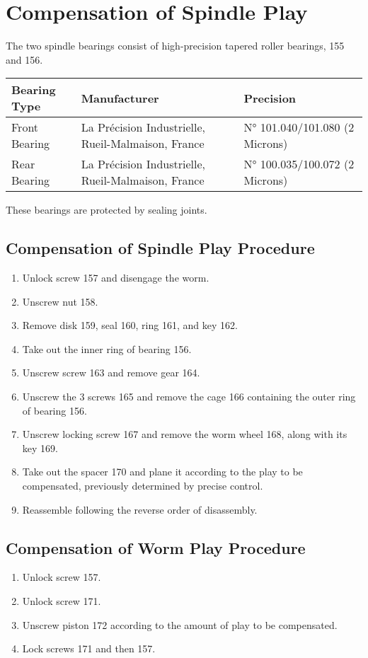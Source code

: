 \section*{Compensation of Spindle Play}

The two spindle bearings consist of high-precision tapered roller bearings, 155 and 156.

\begin{table}[h]
    \centering
    \begin{tabular}{@{}lll@{}}
        \textbf{Bearing Type} & \textbf{Manufacturer}                              & \textbf{Precision}             \\
        \hline
        Front Bearing         & La Précision Industrielle, Rueil-Malmaison, France & N° 101.040/101.080 (2 Microns) \\
        Rear Bearing          & La Précision Industrielle, Rueil-Malmaison, France & N° 100.035/100.072 (2 Microns) \\
    \end{tabular}
\end{table}

These bearings are protected by sealing joints.

\subsection*{Compensation of Spindle Play Procedure}
\begin{enumerate}
    \item Unlock screw 157 and disengage the worm.
    \item Unscrew nut 158.
    \item Remove disk 159, seal 160, ring 161, and key 162.
    \item Take out the inner ring of bearing 156.
    \item Unscrew screw 163 and remove gear 164.
    \item Unscrew the 3 screws 165 and remove the cage 166 containing the outer ring of bearing 156.
    \item Unscrew locking screw 167 and remove the worm wheel 168, along with its key 169.
    \item Take out the spacer 170 and plane it according to the play to be compensated, previously determined by precise control.
    \item Reassemble following the reverse order of disassembly.
\end{enumerate}

\subsection*{Compensation of Worm Play Procedure}
\begin{enumerate}
    \item Unlock screw 157.
    \item Unlock screw 171.
    \item Unscrew piston 172 according to the amount of play to be compensated.
    \item Lock screws 171 and then 157.
\end{enumerate}
